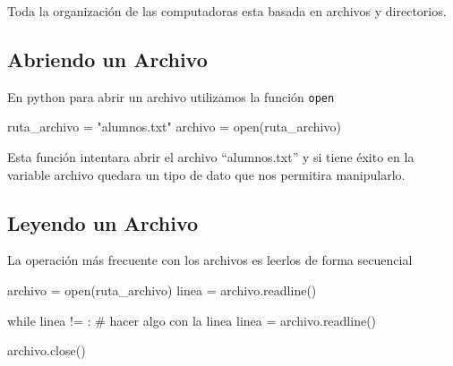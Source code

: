 \documentclass[
  letterpaper,
  DIV=11,
  numbers=noendperiod]{scrreprt}
\newenvironment{Shaded}{\begin{snugshade}}{\end{snugshade}}
\newcommand{\BuiltInTok}[1]{\textcolor[rgb]{0.00,0.23,0.31}{#1}}
\newcommand{\CommentTok}[1]{\textcolor[rgb]{0.37,0.37,0.37}{#1}}
\newcommand{\ControlFlowTok}[1]{\textcolor[rgb]{0.00,0.23,0.31}{#1}}
\newcommand{\NormalTok}[1]{\textcolor[rgb]{0.00,0.23,0.31}{#1}}
\newcommand{\OperatorTok}[1]{\textcolor[rgb]{0.37,0.37,0.37}{#1}}
\newcommand{\StringTok}[1]{\textcolor[rgb]{0.13,0.47,0.30}{#1}}
\begin{document}
\begin{tcolorbox}[enhanced jigsaw, bottomrule=.15mm, leftrule=.75mm, opacityback=0, colback=white, toprule=.15mm, bottomtitle=1mm, opacitybacktitle=0.6, rightrule=.15mm, left=2mm, arc=.35mm, coltitle=black, title=\textcolor{quarto-callout-note-color}{\faInfo}\hspace{0.5em}{Note}, breakable, toptitle=1mm, colframe=quarto-callout-note-color-frame, titlerule=0mm, colbacktitle=quarto-callout-note-color!10!white]

Toda la organización de las computadoras esta basada en archivos y
directorios.

\end{tcolorbox}

\subsection{Abriendo un Archivo}\label{abriendo-un-archivo}

En python para abrir un archivo utilizamos la función \texttt{open}

\begin{Shaded}
\begin{Highlighting}[]
\NormalTok{ruta\_archivo }\OperatorTok{=} \StringTok{"alumnos.txt"}
\NormalTok{archivo }\OperatorTok{=} \BuiltInTok{open}\NormalTok{(ruta\_archivo)}
\end{Highlighting}
\end{Shaded}

Esta función intentara abrir el archivo ``alumnos.txt'' y si tiene éxito
en la variable archivo quedara un tipo de dato que nos permitira
manipularlo.

\subsection{Leyendo un Archivo}\label{leyendo-un-archivo}

La operación más frecuente con los archivos es leerlos de forma
secuencial

\begin{Shaded}
\begin{Highlighting}[]
\NormalTok{archivo }\OperatorTok{=} \BuiltInTok{open}\NormalTok{(ruta\_archivo)}
\NormalTok{linea }\OperatorTok{=}\NormalTok{ archivo.readline()}

\ControlFlowTok{while}\NormalTok{ linea }\OperatorTok{!=} \StringTok{\textquotesingle{}\textquotesingle{}}\NormalTok{:}
  \CommentTok{\# hacer algo con la linea}
\NormalTok{  linea }\OperatorTok{=}\NormalTok{ archivo.readline()}

\NormalTok{archivo.close()}
\end{Highlighting}
\end{Shaded}
\end{document}
